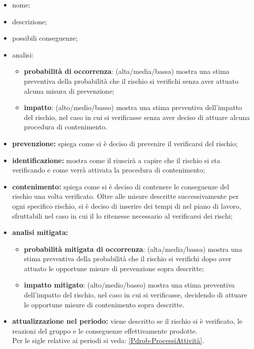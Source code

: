 \begin{itemize}
	\item {nome};
	\item {descrizione};
	\item {possibili conseguenze};
	\item {analisi}:
	\begin{itemize}
		\item \textbf{probabilità di occorrenza}: (alta/media/bassa) mostra una stima preventiva della probabilità che il rischio si verifichi senza aver attuato alcuna misura di prevenzione;
		\item \textbf{impatto}: (alto/medio/basso) mostra una stima preventiva dell'impatto del rischio, nel caso in cui si verificasse senza aver deciso di attuare alcuna procedura di contenimento.
	\end{itemize}
	\item \textbf{{prevenzione}:} spiega come si è deciso di prevenire il verificarsi del rischio;
	\item \textbf{{identificazione}:} mostra come il  riuscirà a capire che il rischio si sta verificando e come verrà attivata la procedura di contenimento;
	\item \textbf{{contenimento}:} spiega come si è deciso di contenere le conseguenze del rischio una volta verificato. Oltre alle misure descritte successivamente per ogni specifico rischio, si è deciso di inserire dei tempi di  nel piano di lavoro, sfruttabili nel caso in cui il \responsabilediprogetto{} lo ritenesse necessario al verificarsi dei rischi;
	\item \textbf{{analisi mitigata}:}
	\begin{itemize}
		\item \textbf{probabilità mitigata di occorrenza}: (alta/media/bassa) mostra una stima preventiva della probabilità che il rischio si verifichi dopo aver attuato le opportune misure di prevenzione sopra descritte;
		\item \textbf{impatto mitigato}: (alto/medio/basso) mostra una stima preventiva dell'impatto del rischio, nel caso in cui si verificasse, decidendo di attuare le opportune misure di contenimento sopra descritte.
	\end{itemize}
	
	\item \textbf{{attualizzazione nel periodo}:} viene descritto se il rischio si è verificato, le reazioni del gruppo e le conseguenze effettivamente prodotte.
	\\Per le sigle relative ai periodi si veda: \ref{Pdrob-ProcessiAttività}.
\end{itemize}




